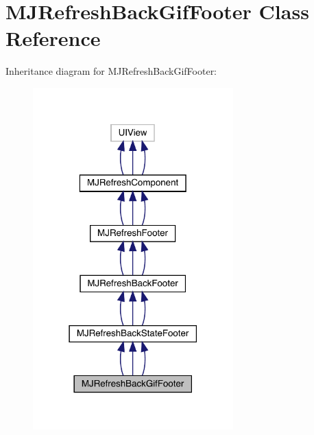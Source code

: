 \hypertarget{interface_m_j_refresh_back_gif_footer}{}\section{M\+J\+Refresh\+Back\+Gif\+Footer Class Reference}
\label{interface_m_j_refresh_back_gif_footer}


Inheritance diagram for M\+J\+Refresh\+Back\+Gif\+Footer\+:\nopagebreak
\begin{figure}[H]
\begin{center}
\leavevmode
\includegraphics[width=219pt]{interface_m_j_refresh_back_gif_footer__inherit__graph}
\end{center}
\end{figure}



